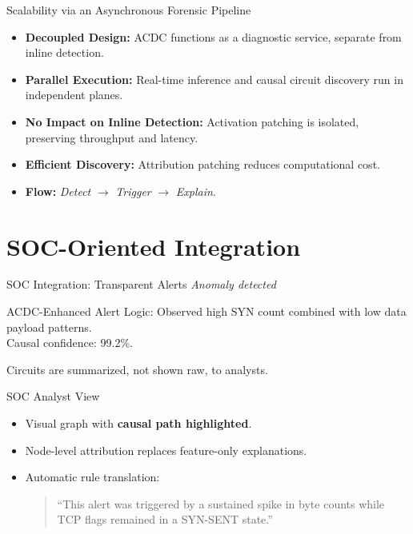 \documentclass{beamer}
\begin{document}
	\begin{frame}{Scalability via an Asynchronous Forensic Pipeline}
		\begin{itemize}
			\item \justifying \textbf{Decoupled Design:}
			ACDC functions as a diagnostic service, separate from inline detection.
			
			\item \justifying \textbf{Parallel Execution:}
			Real-time inference and causal circuit discovery run in independent planes.
			
			\item \justifying \textbf{No Impact on Inline Detection:}
			Activation patching is isolated, preserving throughput and latency.
			
			\item \justifying \textbf{Efficient Discovery:}
			Attribution patching reduces computational cost.
			
			\item \textbf{Flow:}
			\textit{Detect} $\rightarrow$ \textit{Trigger} $\rightarrow$ \textit{Explain}.
		\end{itemize}
	\end{frame}
	
	
	\section{SOC-Oriented Integration}

	\begin{frame}{SOC Integration: Transparent Alerts}
		\textbf{\color{red}{Traditional Alert:}} \textit{Anomaly detected}
		\vfill
		\begin{block}{ACDC-Enhanced Alert}
			Logic: Observed high SYN count combined with low data payload patterns.\\
			Causal confidence: 99.2\%.
		\end{block}
		\vspace{0.5cm}
		Circuits are summarized, not shown raw, to analysts.
	\end{frame}
	
		\begin{frame}{SOC Analyst View}
		\begin{itemize}
			\item Visual graph with \textbf{causal path highlighted}.
			\item Node-level attribution replaces feature-only explanations.
			\item Automatic rule translation:
			\\
			\vspace{1cm}
			\begin{quote}
				\small
				``This alert was triggered by a sustained spike in byte counts
				while TCP flags remained in a SYN-SENT state.''
			\end{quote}
		\end{itemize}
	\end{frame}
	
\end{document}
